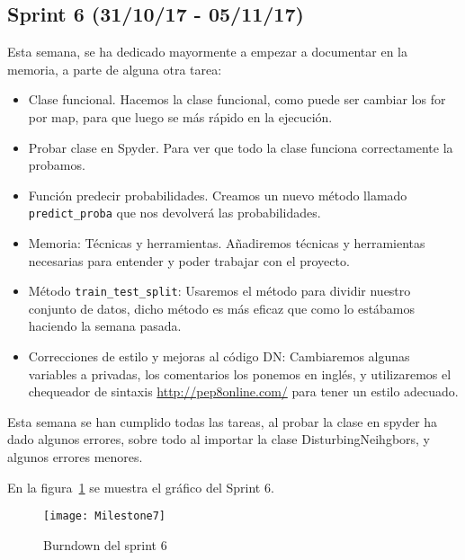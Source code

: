 \subsection{Sprint 6 (31/10/17 - 05/11/17)}
Esta semana, se ha dedicado mayormente a empezar a documentar en la memoria, a parte de alguna otra tarea:
\begin{itemize}
\item Clase funcional. Hacemos la clase funcional, como puede ser cambiar los for por map, para que luego se más rápido en la ejecución.
\item Probar clase en Spyder. Para ver que todo la clase funciona correctamente la probamos.
\item Función predecir probabilidades. Creamos un nuevo método llamado \texttt{predict\_proba} que nos devolverá las probabilidades.
\item Memoria: Técnicas y herramientas. Añadiremos técnicas y herramientas necesarias para entender y poder trabajar con el proyecto.
\item Método \texttt{train\_test\_split}: Usaremos el método para dividir nuestro conjunto de datos, dicho método es más eficaz que como lo estábamos haciendo la semana pasada.
\item Correcciones de estilo y mejoras al código DN: Cambiaremos algunas variables a privadas, los comentarios los ponemos en inglés, y utilizaremos el chequeador de sintaxis \url{http://pep8online.com/} para tener un estilo adecuado.
\end{itemize}

Esta semana se han cumplido todas las tareas, al probar la clase en spyder ha dado algunos errores, sobre todo al importar la clase DisturbingNeihgbors, y algunos errores menores.

En la figura~\ref{fig:Milestone7} se muestra el gráfico del Sprint 6.

\begin{figure}
\centering
\texttt{[image: Milestone7]}
\caption{Burndown del sprint 6}
\label{fig:Milestone7}
\end{figure}

